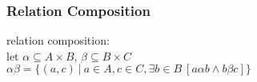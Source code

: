 \documentclass[dvipsnames]{beamer}
\begin{document}
\begin{frame}
  \frametitle{Relation Composition}

  \begin{definition}
    \alert{relation composition}:\\
      let $\alpha \subseteq A \times B$, $\beta \subseteq B \times C$\\
      $\alpha \beta = \{(a,c)~|~a \in A, c \in C,
                \exists b \in B~[a \alpha b \wedge b \beta c]\}$
  \end{definition}

  \begin{example}
    \begin{columns}
      \begin{center}
      \end{center}

      \begin{center}
      \end{center}
    \end{columns}
  \end{example}
\end{frame}
\end{document}
